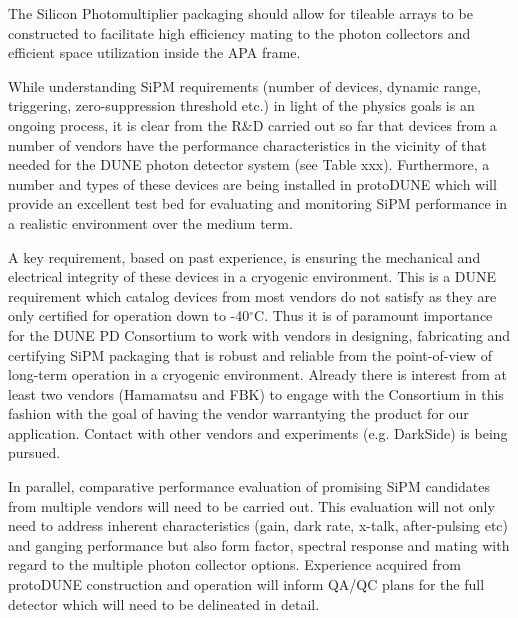 The Silicon Photomultiplier packaging should allow for tileable arrays to be constructed to
facilitate high efficiency mating to the photon collectors and efficient space utilization inside
the APA frame.

While understanding SiPM requirements (number of devices, dynamic range, triggering, 
zero-suppression threshold etc.) in light of the physics goals is an ongoing process, it is clear
from the R$\&$D carried out so far that devices from a number of vendors have the 
performance characteristics in the vicinity of that needed for the DUNE photon detector
system (see Table xxx). Furthermore, a number and types of these devices are being installed in 
protoDUNE which will provide an excellent test bed for evaluating and monitoring SiPM
performance in a realistic environment over the medium term. 

A key requirement, based on past experience, is ensuring the mechanical and electrical 
integrity of these devices in a cryogenic environment. This is a DUNE requirement which 
catalog devices from most vendors do not satisfy as they are only certified for operation 
down to -40$^\circ$C. Thus it is of paramount importance for the DUNE PD Consortium to work 
with vendors in designing, fabricating and certifying SiPM packaging that is robust and
reliable from the point-of-view of long-term operation in a cryogenic environment. Already 
there is interest from at least two vendors (Hamamatsu and FBK) to engage with the
Consortium in this fashion with the goal of having the vendor warrantying the product
for our application. Contact with other vendors and experiments (e.g. DarkSide) is
being pursued.   

In parallel, comparative performance evaluation of promising SiPM candidates from
multiple vendors will need to be carried out. This evaluation will not only need to
address inherent characteristics (gain, dark rate, x-talk, after-pulsing etc) and ganging 
performance but also form factor, spectral response and mating with regard to the
multiple photon collector options. Experience acquired from protoDUNE construction
and operation will inform QA/QC plans for the full detector which will need to be
delineated in detail.


